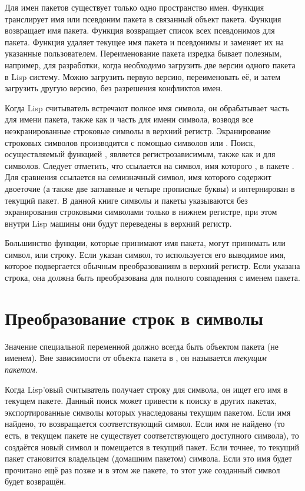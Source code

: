 Для имен пакетов существует только одно пространство имен. Функция
 транслирует имя или псевдоним пакета в связанный объект
пакета. Функция  возвращает имя пакета. Функция
 возвращает список всех псевдонимов для пакета. Функция
 удаляет текущее имя пакета и псевдонимы и заменяет их на
указанные пользователем. Переименование пакета изредка бывает полезным,
например, для разработки, когда необходимо загрузить две версии одного пакета в
Lisp систему. Можно загрузить первую версию, переименовать её, и затем загрузить
другую версию, без разрешения конфликтов имен.

Когда Lisp считыватель встречают полное имя символа, он обрабатывает часть для
имени пакета, также как и часть для имени символа, возводя все неэкранированные
строковые символы в верхний регистр. Экранирование строковых символов
производится с помощью символов \cd{{\Xbackslash}} или \cd{|}. Поиск,
осуществляемый функцией , является регистрозависимым, также
как и для символов. Следует отметить, что  ссылается на символ,
имя которого , в пакете . Для сравнения  ссылается
на семизначный символ, имя которого содержит двоеточие (а также две заглавные и
четыре прописные буквы) и интернирован в текущий пакет. В данной книге символы и
пакеты указываются без экранирования строковыми символами только в нижнем
регистре, при этом внутри Lisp машины они будут переведены в верхний регистр.

Большинство функции, которые принимают имя пакета, могут принимать или символ,
или строку. Если указан символ, то используется его выводимое имя, которое
подвергается обычным преобразованиям в верхний регистр. Если указана строка, она
должна быть преобразована для полного совпадения с именем пакета.

\section{Преобразование строк в символы}
\label{STRING-TO-SYMBOL-SECTION}

Значение специальной переменной  должно всегда быть объектом
пакета (не именем). Вне зависимости от объекта пакета в , он
называется \emph{текущим пакетом}.

Когда Lisp'овый считыватель получает строку для символа, он ищет его имя в
текущем пакете.
Данный поиск может привести к поиску в других пакетах, экспортированные символы
которых унаследованы текущим пакетом. Если имя найдено, то возвращается
соответствующий символ. Если имя не найдено (то есть, в текущем пакете не
существует соответствующего доступного символа), то создаётся новый символ и
помещается в текущий пакет. Если точнее, то текущий пакет становится владельцем
(домашним пакетом) символа.
Если это имя будет прочитано ещё раз позже и в этом же пакете, то этот уже
созданный символ будет возвращён.


